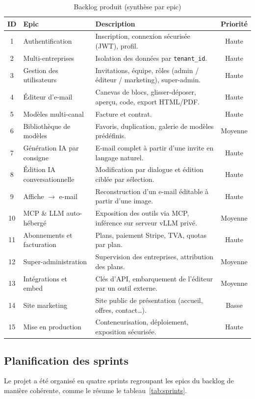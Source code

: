 \documentclass[12pt,a4paper,oneside]{report}
\begin{document}
\begin{table}[H]
\centering
\caption{Backlog produit (synthèse par epic)}
\label{tab:backlog}
\small
\begin{tabularx}{\linewidth}{clXc}
\toprule
\textbf{ID} & \textbf{Epic} & \textbf{Description} & \textbf{Priorité} \\
\midrule
1  & Authentification & Inscription, connexion sécurisée (JWT), profil. & Haute \\
2  & Multi-entreprises & Isolation des données par \texttt{tenant\_id}. & Haute \\
3  & Gestion des utilisateurs & Invitations, équipe, rôles (admin / éditeur / marketing), super-admin. & Haute \\
4  & Éditeur d'e-mail & Canevas de blocs, glisser-déposer, aperçu, code, export HTML/PDF. & Haute \\
5  & Modèles multi-canal & Facture et contrat. & Haute \\
6  & Bibliothèque de modèles & Favoris, duplication, galerie de modèles prédéfinis. & Moyenne \\
7  & Génération IA par consigne & E-mail complet à partir d'une invite en langage naturel. & Haute \\
8  & Édition IA conversationnelle & Modification par dialogue et édition ciblée par sélection. & Haute \\
9  & Affiche $\rightarrow$ e-mail & Reconstruction d'un e-mail éditable à partir d'une image. & Haute \\
10 & MCP \& LLM auto-hébergé & Exposition des outils via MCP, inférence sur serveur vLLM privé. & Moyenne \\
11 & Abonnements et facturation & Plans, paiement Stripe, TVA, quotas par plan. & Haute \\
12 & Super-administration & Supervision des entreprises, attribution des plans. & Moyenne \\
13 & Intégrations et embed & Clés d'API, embarquement de l'éditeur par un outil externe. & Moyenne \\
14 & Site marketing & Site public de présentation (accueil, offres, contact\dots). & Basse \\
15 & Mise en production & Conteneurisation, déploiement, exposition sécurisée. & Haute \\
\bottomrule
\end{tabularx}
\end{table}

\subsection{Planification des sprints}
Le projet a été organisé en quatre sprints regroupant les epics du backlog
de manière cohérente, comme le résume le tableau~\ref{tab:sprints}.
\end{document}
